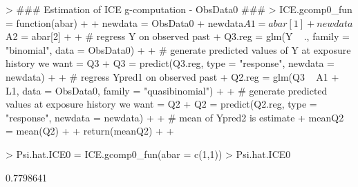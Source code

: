 \documentclass[answers]{exam}
\begin{document}
\begin{solution}
\begin{Schunk}
\begin{Sinput}
> ### Estimation of ICE g-computation - ObsData0 ###
> ICE.gcomp0_fun = function(abar){
+   
+   newdata = ObsData0
+   newdata$A1 = abar[1]
+   newdata$A2 = abar[2]
+   
+   # regress Y on observed past
+   Q3.reg = glm(Y ~ ., family = "binomial", data = ObsData0)
+   
+   # generate predicted values of Y at exposure history we want = Q3
+   Q3 = predict(Q3.reg, type = "response", newdata = newdata)
+   
+   # regress Ypred1 on observed past
+   Q2.reg = glm(Q3 ~ A1 + L1, data = ObsData0, family = "quasibinomial")
+   
+   # generate predicted values at exposure history we want = Q2
+   Q2 = predict(Q2.reg, type = "response", newdata = newdata)
+   
+   # mean of Ypred2 is estimate
+   meanQ2 = mean(Q2)
+   
+   return(meanQ2)
+   
+ }
\end{Sinput}
\end{Schunk}
\begin{Schunk}
\begin{Sinput}
> Psi.hat.ICE0 = ICE.gcomp0_fun(abar = c(1,1))
> Psi.hat.ICE0
\end{Sinput}
\begin{Soutput}
[1] 0.7798641
\end{Soutput}
\end{Schunk}
\end{solution}

\end{document}
